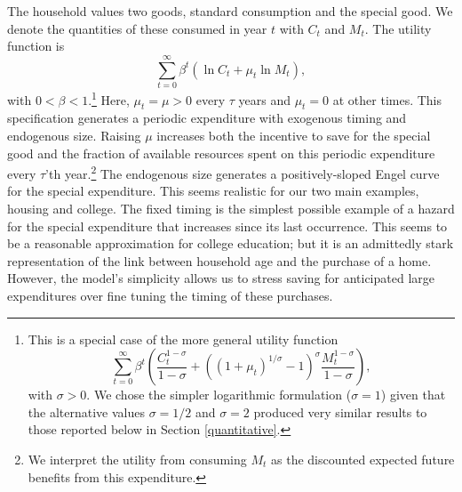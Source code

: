 \documentclass[fleqccn,12pt]{article}
\begin{document}
The household values two goods, standard consumption and the special good. We denote the quantities of these consumed in year $t$ with $C_{t}$ and $M_{t}$. The utility function is
\begin{equation}
{\displaystyle\sum\limits_{t=0}^{\infty}}
\beta^{t}\left( \ln C_{t}+\mu _{t}\ln
M_{t}\right), 
\label{basic_preferences}
\end{equation}
with $0<\beta<1$.\footnote{This is a special case of the more general utility function
\[
{\displaystyle\sum\limits_{t=0}^{\infty}}
\beta^{t}\left( \frac{C_{t}^{1-\sigma}}{1-\sigma}+\left(\left(1+\mu_t\right)^{1/\sigma}-1\right)^\sigma\frac{ M_{t}^{1-\sigma}}{1-\sigma}\right), 
\]
with $\sigma>0$.  We chose the simpler logarithmic formulation ($\sigma=1$) given that the alternative values $\sigma=1/2$ and $\sigma=2$ produced very similar results to those reported below in Section \ref{quantitative}. } Here, $\mu_{t}=\mu>0$ every $\tau$ years and $\mu_{t}=0$ at other times. This specification generates a periodic expenditure with exogenous timing and endogenous size. Raising $\mu$ increases both the incentive to save for the special good and the fraction of available resources spent on this periodic expenditure every $\tau$'th year.\footnote{We interpret the utility from consuming $M_t$ as the discounted expected future benefits from this expenditure.}  The endogenous size generates a positively-sloped Engel curve for the special expenditure. This seems realistic for our two main examples, housing and college. The fixed timing is the simplest possible example of a hazard for the special expenditure that increases since its last occurrence. This seems to be a reasonable approximation for college education; but it is an admittedly stark representation of the link between household age and the purchase of a home. However, the model's simplicity allows us to stress saving for anticipated large expenditures over fine tuning the timing of these purchases.
\end{document}
